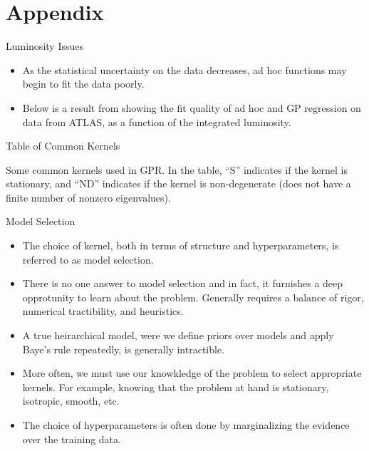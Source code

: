 \documentclass[10pt]{beamer}
\begin{document}
\section{Appendix}
\label{sec:appendix}


\begin{frame}{Luminosity Issues}
  \begin{itemize}
  \item As the statistical uncertainty on the data decreases, ad hoc functions may begin to fit the data poorly. 
  \item Below is a result from \cite{frate_modeling_2017} showing the fit quality of ad hoc and GP regression on data from ATLAS, as a function of the integrated luminosity.
  \end{itemize}
  \begin{center}
  \end{center}
\end{frame}

\begin{frame}{Table of Common Kernels}
  \begin{center}
  \end{center}
  \begin{center}
    Some common kernels used in GPR. In the table, ``S'' indicates if the kernel is stationary, and ``ND'' indicates if the kernel is non-degenerate (does not have a finite number of nonzero eigenvalues).
  \end{center}
\end{frame}

\begin{frame}{Model Selection}
  \begin{itemize}
  \item The choice of kernel, both in terms of structure and hyperparameters, is referred to as model selection. 
  \item There is no one answer to model selection and in fact, it furnishes a deep opprotunity to learn about the problem.
    Generally requires a balance of rigor, numerical tractibility, and heuristics.  
  \item A true heirarchical model, were we define priors over models and apply Baye's rule repeatedly, is generally intractible.
  \item More often, we must use our knowkledge of the problem to select appropriate kernels. For example, knowing that the problem at hand is stationary, isotropic, smooth, etc. 
  \item The choice of hyperparameters is often done by marginalizing the evidence over the training data.
  \end{itemize}
\end{frame}
\end{document}
